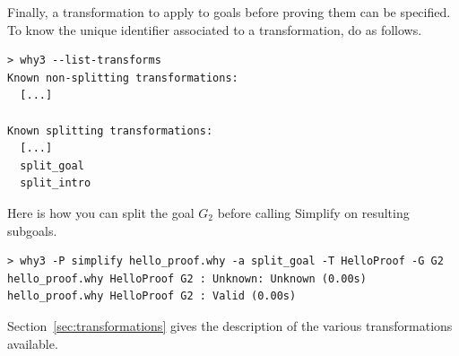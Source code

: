 Finally, a transformation to apply to goals before proving them can be
specified. To know the unique identifier associated to
a transformation, do as follows.
\begin{verbatim}
> why3 --list-transforms
Known non-splitting transformations:
  [...]

Known splitting transformations:
  [...]
  split_goal
  split_intro
\end{verbatim}
Here is how you can split the goal $G_2$ before calling
Simplify on resulting subgoals.
\begin{verbatim}
> why3 -P simplify hello_proof.why -a split_goal -T HelloProof -G G2
hello_proof.why HelloProof G2 : Unknown: Unknown (0.00s)
hello_proof.why HelloProof G2 : Valid (0.00s)
\end{verbatim}
Section~\ref{sec:transformations} gives the description of the various
transformations available.

